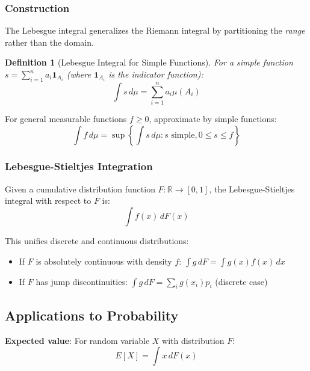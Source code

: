 \documentclass[12pt,a4paper]{article}
\newtheorem{definition}{Definition}
\begin{document}
\subsubsection{Construction}

The Lebesgue integral generalizes the Riemann integral by partitioning the \textit{range} rather than the domain.

\begin{definition}[Lebesgue Integral for Simple Functions]
For a simple function $s = \sum_{i=1}^n a_i \mathbf{1}_{A_i}$ (where $\mathbf{1}_{A_i}$ is the indicator function):
\begin{equation}
\int s\,d\mu = \sum_{i=1}^n a_i \mu(A_i)
\end{equation}
\end{definition}

For general measurable functions $f \geq 0$, approximate by simple functions:
\begin{equation}
\int f\,d\mu = \sup\left\{\int s\,d\mu : s \text{ simple}, 0 \leq s \leq f\right\}
\end{equation}

\subsubsection{Lebesgue-Stieltjes Integration}

Given a cumulative distribution function $F: \mathbb{R} \to [0,1]$, the Lebesgue-Stieltjes integral with respect to $F$ is:
\begin{equation}
\int f(x)\,dF(x)
\end{equation}

This unifies discrete and continuous distributions:
\begin{itemize}
\item If $F$ is absolutely continuous with density $f$: $\int g\,dF = \int g(x)f(x)\,dx$
\item If $F$ has jump discontinuities: $\int g\,dF = \sum_i g(x_i) p_i$ (discrete case)
\end{itemize}

\subsection{Applications to Probability}

\textbf{Expected value}: For random variable $X$ with distribution $F$:
\begin{equation}
E[X] = \int x\,dF(x)
\end{equation}
\end{document}
